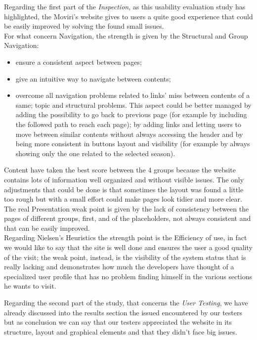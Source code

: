 Regarding the first part of the \textit{Inspection}, as this usability evaluation study has highlighted, the Moviri’s website gives to users a quite good experience that could be easily improved by solving the found small issues.\\ 
For what concern Navigation, the strength is given by the Structural and Group Navigation:
\begin{itemize}
\item ensure a consistent aspect between pages; 
\item give an intuitive way to navigate between contents; 
\item overcome all navigation problems related to links’ miss between contents of a same; topic and structural problems. This aspect could be better managed by adding the possibility to go back to previous page (for example by including the followed path to reach each page); by adding links and letting users to move between similar contents without always accessing the header and by being more consistent in buttons layout and visibility (for example by always showing only the one related to the selected season).
\end{itemize}
Content have taken the best score between the 4 groups because the website contains lots of information well organized and without visible issues. The only adjustments that could be done is that sometimes the layout was found a little too rough but with a small effort could make pages look tidier and more clear.\\
The real Presentation weak point is given by the lack of consistency between the pages of different groups, first, and of the placeholders, not always consistent and that can be easily improved.\\
Regarding Nielsen’s Heuristics the strength point is the Efficiency of use, in fact we would like to say that the site is well done and ensures the user a good quality of the visit; the weak point, instead, is the visibility of the system status that is really lacking and demonstrates how much the developers have thought of a specialized user profile that has no problem finding himself in the various sections he wants to visit.
\par
Regarding the second part of the study, that concerns the \textit{User Testing}, we have already discussed into the results section the issued encountered by our testers but as conclusion we can say that our testers appreciated the website in its structure, layout and graphical elements and that they didn’t face big issues.\\
